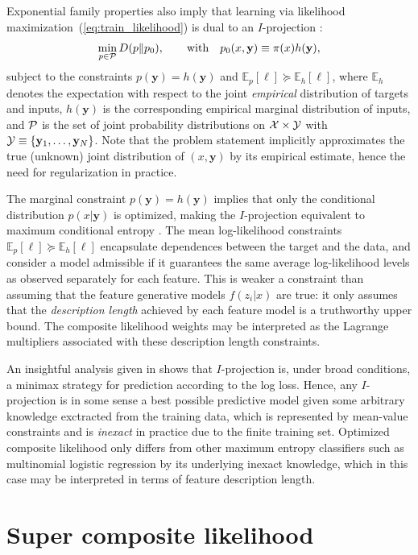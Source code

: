 \documentclass[english]{scrartcl}
\def\y{{\mathbf{y}}}
\newcommand{\bell}{{\boldsymbol{\ell}}}
\newcommand{\E}{\mathbb{E}}
\begin{document}
Exponential family properties also imply that learning via likelihood maximization~(\ref{eq:train_likelihood}) is dual to an $I$-projection \cite{Csiszar-84}: 
\begin{equation}
\label{eq:i_proj}
\min_{p\in{\cal P}} D(p\|p_0),
\qquad \text{with} \quad
p_0(x,\y) \equiv \pi(x)h(\y),
\end{equation}
subject to the constraints $p(\y)=h(\y)$ and $\E_p[\bell] \succeq \E_h[\bell]$, where $\E_h$ denotes the expectation with respect to the joint {\em empirical} distribution of targets and inputs, $h(\y)$ is the corresponding empirical marginal distribution of inputs, and ${\cal P}$ is the set of joint probability distributions on ${\cal X}\times {\cal Y}$ with ${\cal Y}\equiv\{\y_1,\ldots,\y_N\}$. Note that the problem statement implicitly approximates the true (unknown) joint distribution of $(x,\y)$ by its empirical estimate, hence the need for regularization in practice.

The marginal constraint $p(\y)=h(\y)$ implies that only the conditional distribution $p(x|\y)$ is optimized, making the $I$-projection equivalent to maximum conditional entropy \cite{BergerA-96}. The mean log-likelihood constraints $\E_p[\bell] \succeq \E_h[\bell]$ encapsulate dependences between the target and the data, and consider a model admissible if it guarantees the same average log-likelihood levels as observed separately for each feature. This is weaker a constraint than assuming that the feature generative models $f(z_i|x)$ are true: it only assumes that the {\em description length} \cite{Grunwald-07} achieved by each feature model is a truthworthy upper bound. The composite likelihood weights may be interpreted as the Lagrange multipliers associated with these description length constraints. 

An insightful analysis given in \cite{Grunwald-04} shows that $I$-projection is, under broad conditions, a minimax strategy for prediction according to the log loss. Hence, any $I$-projection is in some sense a best possible predictive model given some arbitrary knowledge exctracted from the training data, which is represented by mean-value constraints and is {\em inexact} in practice due to the finite training set. Optimized composite likelihood only differs from other maximum entropy classifiers such as multinomial logistic regression by its underlying inexact knowledge, which in this case may be interpreted in terms of feature description length.


\section{Super composite likelihood}
\label{sec:super}
\end{document}
